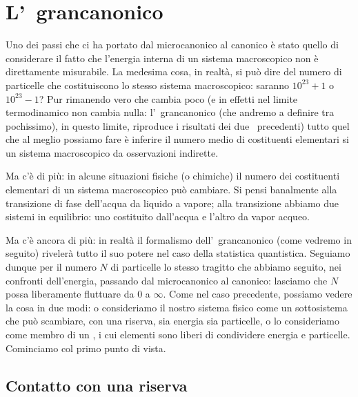 \chapter{L'\ensemble\ grancanonico}
\label{cap:grancanonico}

Uno dei passi che ci ha portato dal microcanonico al canonico è stato quello di considerare il fatto che l'energia interna di un sistema macroscopico non è direttamente misurabile. La medesima cosa, in realtà, si può dire del numero di particelle che costituiscono lo stesso sistema macroscopico: saranno $10^{23} + 1$ o $10^{23} - 1$? Pur rimanendo vero che cambia poco (e in effetti nel limite termodinamico non cambia nulla: l'\ensemble\ grancanonico (che andremo a definire tra pochissimo), in questo limite, riproduce i risultati dei due \ensembles\ precedenti) tutto quel che al meglio possiamo fare è inferire il numero medio di costituenti elementari si un sistema macroscopico da osservazioni indirette.

Ma c'è di più: in alcune situazioni fisiche (o chimiche) il numero dei costituenti elementari di un sistema macroscopico può cambiare. Si pensi banalmente alla transizione di fase dell'acqua da liquido a vapore; alla transizione abbiamo due sistemi in equilibrio: uno costituito dall'acqua e l'altro da vapor acqueo.

Ma c'è ancora di più: in realtà il formalismo dell'\ensemble\ grancanonico (come vedremo in seguito) rivelerà tutto il suo potere nel caso della statistica quantistica. Seguiamo dunque per il numero $N$ di particelle lo stesso tragitto che abbiamo seguito, nei confronti dell'energia, passando dal microcanonico al canonico: lasciamo che $N$ possa liberamente fluttuare da $0$ a $\infty$. Come nel caso precedente, possiamo vedere la cosa in due modi: o consideriamo il nostro sistema fisico come un sottosistema che può scambiare, con una riserva, sia energia sia particelle, o lo consideriamo come membro di un \ensemble, i cui elementi sono liberi di condividere energia e particelle. Cominciamo col primo punto di vista.

\section{Contatto con una riserva}
\label{sec:05-contatto}

